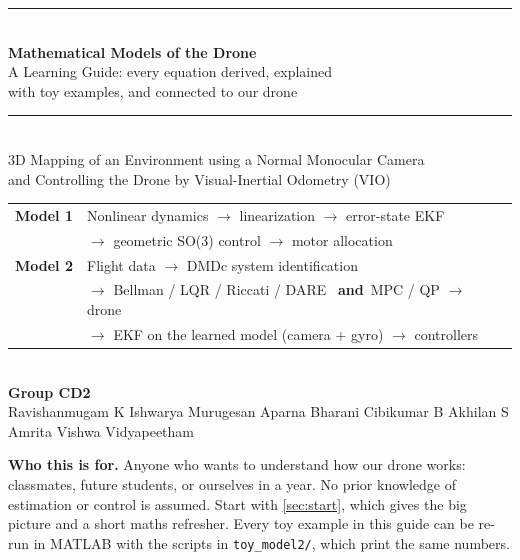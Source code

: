 \documentclass[11pt,a4paper]{article}
\newcommand{\code}[1]{\texttt{\small #1}}
\begin{document}
\begin{titlepage}
  \centering
  \vspace*{1.5cm}
  {\color{cHead}\rule{\linewidth}{1.2pt}}\\[14pt]
  {\Huge\sffamily\bfseries\color{cHead} Mathematical Models of the Drone\\[6pt]}
  {\Large\sffamily\color{cText} A Learning Guide: every equation derived, explained\\ with toy examples, and connected to our drone\\[10pt]}
  {\color{cHead}\rule{\linewidth}{1.2pt}}\\[22pt]
  {\large\sffamily 3D Mapping of an Environment using a Normal Monocular Camera\\
   and Controlling the Drone by Visual-Inertial Odometry (VIO)\\[22pt]}
  \begin{minipage}{0.86\linewidth}\centering\small
  \begin{tabular}{ll}
    \toprule
    \textbf{Model 1} & Nonlinear dynamics $\rightarrow$ linearization $\rightarrow$ error-state EKF\\
                     & $\rightarrow$ geometric SO(3) control $\rightarrow$ motor allocation\\[3pt]
    \textbf{Model 2} & Flight data $\rightarrow$ DMDc system identification\\
                     & $\rightarrow$ Bellman / LQR / Riccati / DARE \ \textbf{and}\ MPC / QP $\rightarrow$ drone\\
                     & $\rightarrow$ EKF on the learned model (camera + gyro) $\rightarrow$ controllers\\
    \bottomrule
  \end{tabular}
  \end{minipage}\\[30pt]
  {\large\sffamily\bfseries Group CD2}\\[6pt]
  {\sffamily Ravishanmugam K \;\textbullet\; Ishwarya Murugesan \;\textbullet\; Aparna Bharani \;\textbullet\; Cibikumar B \;\textbullet\; Akhilan S}\\[4pt]
  {\sffamily\small Amrita Vishwa Vidyapeetham}
  \vfill
  \begin{minipage}{0.9\linewidth}\small\color{cText}
  \textbf{Who this is for.} Anyone who wants to understand how our drone works: classmates, future students,
  or ourselves in a year. No prior knowledge of estimation or control is assumed. Start with
  \cref{sec:start}, which gives the big picture and a short maths refresher. Every toy example in this guide can
  be re-run in MATLAB with the scripts in \code{toy\_model2/}, which print the same numbers.
  \end{minipage}
\end{titlepage}

\tableofcontents
\newpage







\appendix

\end{document}
